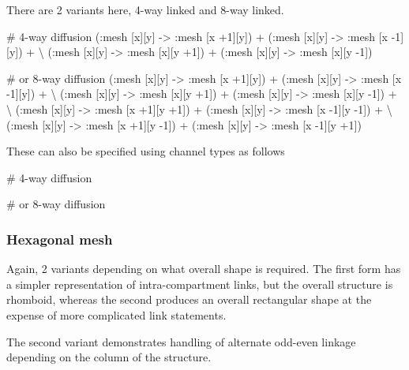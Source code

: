 There are 2 variants here, 4-way linked and 8-way linked.

\begin{kappasource}

# 4-way diffusion
    (:mesh [x][y] -> :mesh [x +1][y]) + (:mesh [x][y] -> :mesh [x -1][y]) + {\textbackslash}
    (:mesh [x][y] -> :mesh [x][y +1]) + (:mesh [x][y] -> :mesh [x][y -1])

# or 8-way diffusion
    (:mesh [x][y] -> :mesh [x +1][y]) + (:mesh [x][y] -> :mesh [x -1][y]) + {\textbackslash}
    (:mesh [x][y] -> :mesh [x][y +1]) + (:mesh [x][y] -> :mesh [x][y -1]) + {\textbackslash}
    (:mesh [x][y] -> :mesh [x +1][y +1]) + (:mesh [x][y] -> :mesh [x -1][y -1]) + {\textbackslash}
    (:mesh [x][y] -> :mesh [x +1][y -1]) + (:mesh [x][y] -> :mesh [x -1][y +1])
\end{kappasource}

These can also be specified using channel types as follows

\begin{kappasource}

# 4-way diffusion

# or 8-way diffusion
\end{kappasource}

\subsubsection{Hexagonal mesh}

Again, 2 variants depending on what overall shape is required. The first form has a simpler representation of intra-compartment links, but the overall structure is rhomboid, whereas the second produces an overall rectangular shape at the expense of more complicated link statements.

The second variant demonstrates handling of alternate odd-even linkage depending on the column of the structure.

